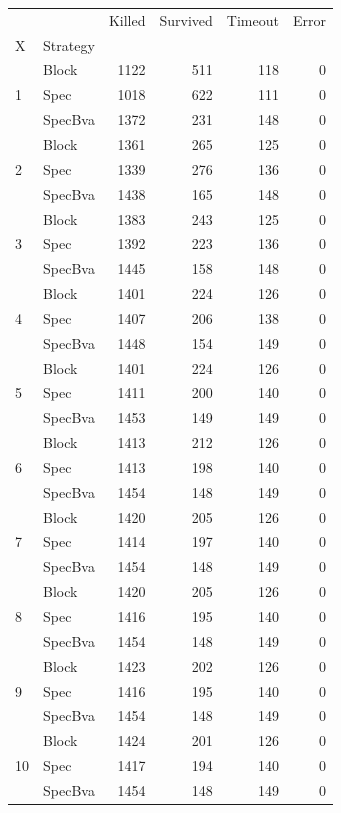 \begin{tabular}{llrrrr}
\toprule
 &  & Killed & Survived & Timeout & Error \\
X & Strategy &  &  &  &  \\
\midrule
\multirow[t]{3}{*}{1} & Block & 1122 & 511 & 118 & 0 \\
 & Spec & 1018 & 622 & 111 & 0 \\
 & SpecBva & 1372 & 231 & 148 & 0 \\
\cline{1-6}
\multirow[t]{3}{*}{2} & Block & 1361 & 265 & 125 & 0 \\
 & Spec & 1339 & 276 & 136 & 0 \\
 & SpecBva & 1438 & 165 & 148 & 0 \\
\cline{1-6}
\multirow[t]{3}{*}{3} & Block & 1383 & 243 & 125 & 0 \\
 & Spec & 1392 & 223 & 136 & 0 \\
 & SpecBva & 1445 & 158 & 148 & 0 \\
\cline{1-6}
\multirow[t]{3}{*}{4} & Block & 1401 & 224 & 126 & 0 \\
 & Spec & 1407 & 206 & 138 & 0 \\
 & SpecBva & 1448 & 154 & 149 & 0 \\
\cline{1-6}
\multirow[t]{3}{*}{5} & Block & 1401 & 224 & 126 & 0 \\
 & Spec & 1411 & 200 & 140 & 0 \\
 & SpecBva & 1453 & 149 & 149 & 0 \\
\cline{1-6}
\multirow[t]{3}{*}{6} & Block & 1413 & 212 & 126 & 0 \\
 & Spec & 1413 & 198 & 140 & 0 \\
 & SpecBva & 1454 & 148 & 149 & 0 \\
\cline{1-6}
\multirow[t]{3}{*}{7} & Block & 1420 & 205 & 126 & 0 \\
 & Spec & 1414 & 197 & 140 & 0 \\
 & SpecBva & 1454 & 148 & 149 & 0 \\
\cline{1-6}
\multirow[t]{3}{*}{8} & Block & 1420 & 205 & 126 & 0 \\
 & Spec & 1416 & 195 & 140 & 0 \\
 & SpecBva & 1454 & 148 & 149 & 0 \\
\cline{1-6}
\multirow[t]{3}{*}{9} & Block & 1423 & 202 & 126 & 0 \\
 & Spec & 1416 & 195 & 140 & 0 \\
 & SpecBva & 1454 & 148 & 149 & 0 \\
\cline{1-6}
\multirow[t]{3}{*}{10} & Block & 1424 & 201 & 126 & 0 \\
 & Spec & 1417 & 194 & 140 & 0 \\
 & SpecBva & 1454 & 148 & 149 & 0 \\
\cline{1-6}
\bottomrule
\end{tabular}

